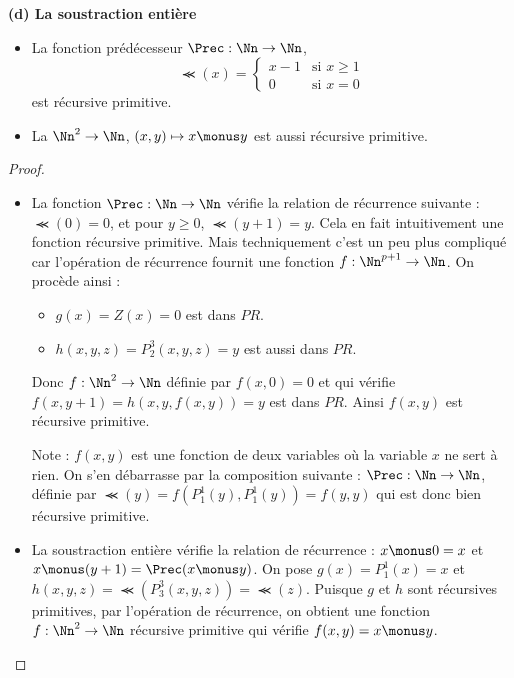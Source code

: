 \documentclass[11pt,class=report,crop=false]{standalone}
\begin{document}
\medskip

\textbf{(d) La soustraction entière}

\begin{proposition}
    \sauteligne
\begin{itemize}
    \item La fonction prédécesseur $\Prec : \Nn \to \Nn$, 
\[ \Prec(x) = \begin{cases} 
    x-1 & \text{si } x \ge 1 \\ 
    0 & \text{si } x=0 
\end{cases} \]
est récursive primitive.
    
    \item La  $\Nn^2 \to \Nn$, $(x,y) \mapsto x \monus y$ est aussi récursive primitive.

\end{itemize}
\end{proposition}

\begin{proof}~
\begin{itemize}
    \item La fonction $\Prec : \Nn \to \Nn$ vérifie la relation de récurrence suivante : $\Prec(0)=0$, et pour $y \ge 0$, $\Prec(y+1)=y$.
    Cela en fait intuitivement une fonction récursive primitive.
Mais techniquement c'est un peu plus compliqué car l'opération de récurrence fournit une fonction $f : \Nn^{p+1} \to \Nn$.
On procède ainsi :
\begin{itemize}
    \item $g(x) = Z(x) = 0$ est dans $PR$.
    \item $h(x,y,z) = P_2^3(x,y,z) = y$ est aussi dans $PR$.
\end{itemize}
Donc $f : \Nn^2 \to \Nn$ définie par $f(x,0)=0$ et qui vérifie $f(x,y+1) = h(x,y,f(x,y)) = y$ est dans $PR$. Ainsi $f(x,y)$ est récursive primitive.

Note : $f(x,y)$ est une fonction de deux variables où la variable $x$ ne sert à rien. On s'en débarrasse par la composition suivante :
$\Prec : \Nn \to \Nn$, définie par $\Prec(y) = f(P_1^1(y), P_1^1(y)) = f(y,y)$ qui est donc bien récursive primitive.

    \item La soustraction entière vérifie la relation de récurrence : $x \monus 0 = x$ et $x \monus (y+1) = \Prec(x \monus y)$.
On pose $g(x) = P_1^1(x) = x$ et $h(x,y,z) = \Prec(P_3^3(x,y,z)) = \Prec(z)$. 
Puisque $g$ et $h$ sont récursives primitives, par l'opération de récurrence, on obtient une fonction $f : \Nn^2 \to \Nn$ récursive primitive qui vérifie $f(x,y) = x \monus y$.
\end{itemize}
    
\end{proof}
\end{document}
